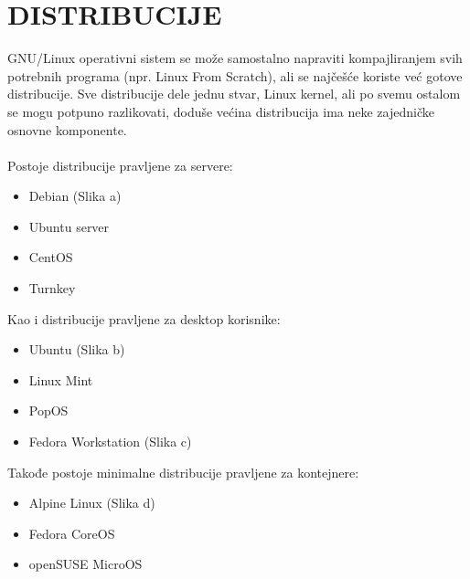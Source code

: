 \documentclass[a4paper,14pt]{article}
\begin{document}
\section{DISTRIBUCIJE}
GNU/Linux operativni sistem se može samostalno napraviti kompajliranjem svih potrebnih programa (npr. Linux From Scratch), ali se najčešće koriste već gotove distribucije. Sve distribucije dele jednu stvar, Linux kernel, ali po svemu ostalom se mogu potpuno razlikovati, doduše većina distribucija ima neke zajedničke osnovne komponente.
\\\\
Postoje distribucije pravljene za servere:
\begin{itemize}
\item Debian (Slika a)
\item Ubuntu server
\item CentOS
\item Turnkey
\end{itemize}
Kao i distribucije pravljene za desktop korisnike:
\begin{itemize}
\item Ubuntu (Slika b)
\item Linux Mint
\item PopOS
\item Fedora Workstation (Slika c)
\end{itemize}
Takođe postoje minimalne distribucije pravljene za kontejnere:
\begin{itemize}
\item Alpine Linux (Slika d)
\item Fedora CoreOS
\item openSUSE MicroOS
\end{itemize}
\end{document}

